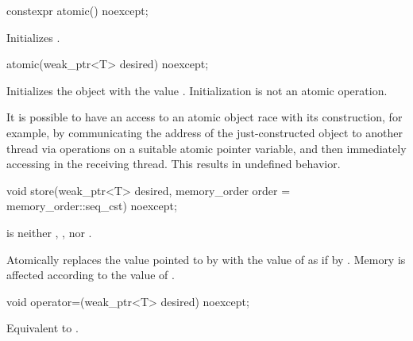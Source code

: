 %
\begin{itemdecl}
constexpr atomic() noexcept;
\end{itemdecl}

\begin{itemdescr}
\pnum
\effects
Initializes .
\end{itemdescr}

%
\begin{itemdecl}
atomic(weak_ptr<T> desired) noexcept;
\end{itemdecl}

\begin{itemdescr}
\pnum
\effects
Initializes the object with the value .
Initialization is not an atomic operation.
\begin{note}
It is possible to have an access to
an atomic object  race with its construction,
for example,
by communicating the address of the just-constructed object 
to another thread via  operations
on a suitable atomic pointer variable, and
then immediately accessing  in the receiving thread.
This results in undefined behavior.
\end{note}
\end{itemdescr}

%
\begin{itemdecl}
void store(weak_ptr<T> desired, memory_order order = memory_order::seq_cst) noexcept;
\end{itemdecl}

\begin{itemdescr}
\pnum
\expects
{} is neither
,
, nor
.

\pnum
\effects
Atomically replaces the value pointed to by  with
the value of  as if by .
Memory is affected according to the value of .
\end{itemdescr}

%
\begin{itemdecl}
void operator=(weak_ptr<T> desired) noexcept;
\end{itemdecl}

\begin{itemdescr}
\pnum
\effects
Equivalent to .
\end{itemdescr}

